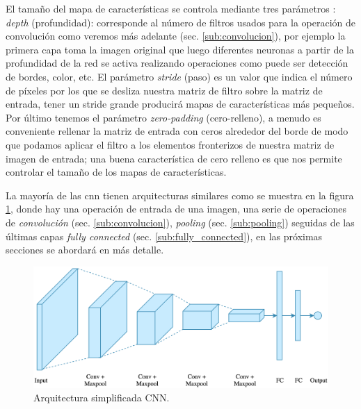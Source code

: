 El tamaño del mapa de características se controla mediante tres parámetros \citep{cnnsarticle}: \textit{depth} (profundidad): corresponde al número de filtros usados para la operación de convolución como veremos más adelante (sec. \ref{sub:convolucion}), por ejemplo la primera capa toma la imagen original que luego diferentes neuronas a partir de la profundidad de la red se activa realizando operaciones como puede ser detección de bordes, color, etc. El parámetro \textit{stride} (paso) es un valor que indica el número de píxeles por los que se desliza nuestra matriz de filtro sobre la matriz de entrada, tener un stride grande producirá mapas de características más pequeños. Por último tenemos el parámetro \textit{zero-padding} (cero-relleno), a menudo es conveniente rellenar la matriz de entrada con ceros alrededor del borde de modo que podamos aplicar el filtro a los elementos fronterizos de nuestra matriz de imagen de entrada; una buena característica de cero relleno es que nos permite controlar el tamaño de los mapas de características.

La mayoría de las \ac{cnn} tienen arquitecturas similares como se muestra en la figura \ref{Fig:cnn_network}, donde hay una operación de entrada de una imagen, una serie de operaciones de  \textit{convolución} (sec. \ref{sub:convolucion}),  \textit{pooling} (sec. \ref{sub:pooling}) seguidas de las últimas capas \textit{fully connected} (sec. \ref{sub:fully_connected}), en las próximas secciones se abordará en más detalle. 

\begin{figure}[H]\centering
  \includegraphics[scale=0.2,keepaspectratio=true,clip=true]{imagenes/MarcoTeorico/cnn_intuition.png}
  \caption{Arquitectura simplificada CNN.}
  \label{Fig:cnn_network}
\end{figure}




